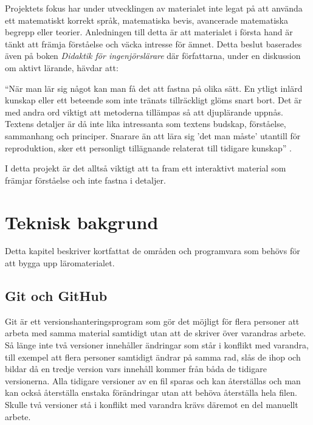 \documentclass[12pt,a4paper,twoside,openright]{article}
\begin{document}
Projektets fokus har under utvecklingen av materialet inte legat på
att använda ett matematiskt korrekt språk, matematiska bevis,
avancerade matematiska begrepp eller teorier. Anledningen till detta
är att materialet i första hand är tänkt att främja förståelse och
väcka intresse för ämnet. Detta beslut baserades även på boken
\textit{Didaktik för ingenjörslärare} där författarna, under en
diskussion om aktivt lärande, hävdar att:
\begin{displayquote}
``När man lär sig något kan
man få det att fastna på olika sätt. En ytligt inlärd kunskap eller
ett beteende som inte tränats tillräckligt glöms snart bort. Det är
med andra ord viktigt att metoderna tillämpas så att djuplärande
uppnås. Textens detaljer är då inte lika intressanta som textens
budskap, förståelse, sammanhang och principer. Snarare än att lära sig
'det man måste' utantill för reproduktion, sker ett personligt
tillägnande relaterat till tidigare kunskap''
\cite[s~236]{didaktik_for_ingenjorslarare}.
\end{displayquote}
I detta projekt är det alltså viktigt att ta fram ett interaktivt
material som främjar förståelse och inte fastna i detaljer.

\newpage

\section{Teknisk bakgrund}
Detta kapitel beskriver kortfattat de områden och programvara som
behövs för att bygga upp läromaterialet.


\subsection{Git och GitHub}
\gls{Git} är ett versionshanteringsprogram som gör det möjligt för
flera personer att arbeta med samma material samtidigt utan att de
skriver över varandras arbete. Så länge inte två versioner innehåller
ändringar som står i konflikt med varandra, till exempel att flera
personer samtidigt ändrar på samma rad, slås de ihop och bildar då en
tredje version vars innehåll kommer från båda de tidigare
versionerna. Alla tidigare versioner av en fil sparas och kan
återställas och man kan också återställa enstaka förändringar utan att
behöva återställa hela filen. Skulle två versioner stå i konflikt med
varandra krävs däremot en del manuellt arbete.
\end{document}
